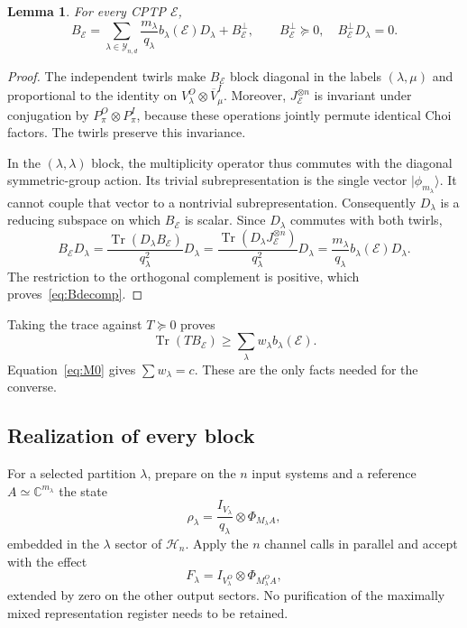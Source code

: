 \documentclass[11pt,a4paper]{article}
\newtheorem{lemma}[theorem]{Lemma}
\theoremstyle{remark}\newtheorem{remark}[theorem]{Remark}
\DeclareMathOperator{\Tr}{Tr}
\newcommand{\cE}{\mathcal E}
\newcommand{\cH}{\mathcal H}
\newcommand{\cY}{\mathcal Y_{n,d}}
\newcommand{\ket}[1]{\lvert #1\rangle}
\newcommand{\bbC}{\mathbb C}
\begin{document}
\begin{lemma}\label{lem:block}
For every CPTP $\cE$,
\begin{equation}\label{eq:Bdecomp}
 B_{\cE}=\sum_{\lambda\in\cY}
 \frac{m_\lambda}{q_\lambda}b_\lambda(\cE)D_\lambda+B_{\cE}^{\perp},
 \qquad B_{\cE}^{\perp}\succeq0,\quad B_{\cE}^{\perp}D_\lambda=0.
\end{equation}
\end{lemma}
\begin{proof}
The independent twirls make $B_{\cE}$ block diagonal in the labels $(\lambda,\mu)$ and proportional to the identity on $V_\lambda^O\otimes\overline V_\mu^I$. Moreover, $J_{\cE}^{\otimes n}$ is invariant under conjugation by $P_\pi^O\otimes P_\pi^I$, because these operations jointly permute identical Choi factors. The twirls preserve this invariance.

In the $(\lambda,\lambda)$ block, the multiplicity operator thus commutes with the diagonal symmetric-group action. Its trivial subrepresentation is the single vector $\ket{\phi_{m_\lambda}}$. It cannot couple that vector to a nontrivial subrepresentation. Consequently $D_\lambda$ is a reducing subspace on which $B_{\cE}$ is scalar. Since $D_\lambda$ commutes with both twirls,
\begin{equation}
 B_{\cE}D_\lambda=
 \frac{\Tr(D_\lambda B_{\cE})}{q_\lambda^2}D_\lambda
 =\frac{\Tr(D_\lambda J_{\cE}^{\otimes n})}{q_\lambda^2}D_\lambda
 =\frac{m_\lambda}{q_\lambda}b_\lambda(\cE)D_\lambda.
\end{equation}
The restriction to the orthogonal complement is positive, which proves~\eqref{eq:Bdecomp}.
\end{proof}

Taking the trace against $T\succeq0$ proves
\begin{equation}
 \Tr(TB_{\cE})\geq\sum_\lambda w_\lambda b_\lambda(\cE).
\end{equation}
Equation~\eqref{eq:M0} gives $\sum w_\lambda=c$. These are the only facts needed for the converse.

\subsection{Realization of every block}
For a selected partition $\lambda$, prepare on the $n$ input systems and a reference $A\simeq\bbC^{m_\lambda}$ the state
\begin{equation}\label{eq:probe}
 \rho_\lambda=\frac{I_{V_\lambda}}{q_\lambda}\otimes
 \Phi_{M_\lambda A},
\end{equation}
embedded in the $\lambda$ sector of $\cH_n$. Apply the $n$ channel calls in parallel and accept with the effect
\begin{equation}\label{eq:measurement}
 F_\lambda=I_{V_\lambda^O}\otimes\Phi_{M_\lambda^O A},
\end{equation}
extended by zero on the other output sectors. No purification of the maximally mixed representation register needs to be retained.
\end{document}
